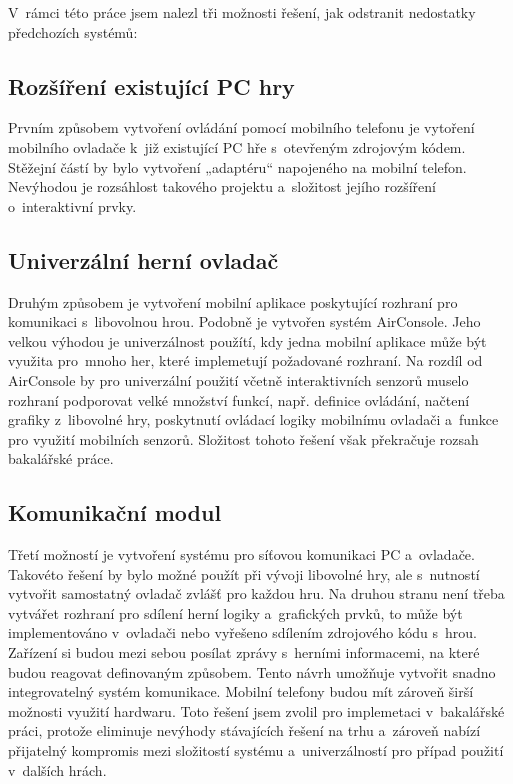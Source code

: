 \documentclass[thesis=B,czech,hidelinks]{FITthesis}[2012/06/26] %
\begin{document}
V~rámci této práce jsem nalezl tři možnosti řešení, jak odstranit nedostatky předchozích systémů:

\subsection{Rozšíření existující PC hry}

Prvním způsobem vytvoření ovládání pomocí mobilního telefonu je vytoření mobilního ovladače k~již existující PC hře s~otevřeným zdrojovým kódem. Stěžejní částí by bylo vytvoření „adaptéru“ napojeného na mobilní telefon. Nevýhodou je rozsáhlost takového projektu a~složitost jejího rozšíření o~interaktivní prvky.

\subsection{Univerzální herní ovladač}

Druhým způsobem je vytvoření mobilní aplikace poskytující rozhraní pro komunikaci s~libovolnou hrou. Podobně je vytvořen systém AirConsole. Jeho velkou výhodou je univerzálnost použítí, kdy jedna mobilní aplikace může být využita pro~mnoho her, které implemetují požadované rozhraní. Na rozdíl od AirConsole by pro univerzální použití včetně interaktivních senzorů muselo rozhraní podporovat velké množství funkcí, např. definice ovládání, načtení grafiky z~libovolné hry, poskytnutí ovládací logiky mobilnímu ovladači a~funkce pro využití mobilních senzorů. Složitost tohoto řešení však překračuje rozsah bakalářské práce.

\subsection{Komunikační modul}

Třetí možností je vytvoření systému pro síťovou komunikaci PC a~ovladače. Takovéto řešení by bylo možné použít při vývoji libovolné hry, ale s~nutností vytvořit samostatný ovladač zvlášť pro každou hru. Na druhou stranu není třeba vytvářet rozhraní pro sdílení herní logiky a~grafických prvků, to může být implementováno v~ovladači nebo vyřešeno sdílením zdrojového kódu s~hrou. Zařízení si budou mezi sebou posílat zprávy s~herními informacemi, na které budou reagovat definovaným způsobem. Tento návrh umožňuje vytvořit snadno integrovatelný systém komunikace. Mobilní telefony budou mít zároveň širší možnosti využití hardwaru. Toto řešení jsem zvolil pro implemetaci v~bakalářské práci, protože eliminuje nevýhody stávajících řešení na trhu a~zároveň nabízí přijatelný kompromis mezi složitostí systému a~univerzálností pro případ použití v~dalších hrách. 
\end{document}
